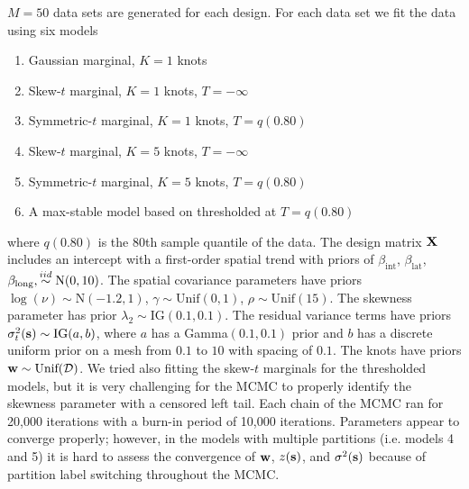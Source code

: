 \documentclass[11pt]{article}
\begin{document}


$M = 50$ data sets are generated for each design.
For each data set we fit the data using six models
\begin{enumerate} \setlength{\itemsep}{-0.5em}
  \item Gaussian marginal, $K=1$ knots
  \item Skew-$t$ marginal, $K=1$ knots, $T=-\infty$
  \item Symmetric-$t$ marginal, $K=1$ knots, $T=q(0.80)$
  \item Skew-$t$ marginal, $K=5$ knots, $T=-\infty$
  \item Symmetric-$t$ marginal, $K=5$ knots, $T=q(0.80)$
  \item A max-stable model based on \citet{Reich2012} thresholded at $T = q(0.80)$
\end{enumerate}
where $q(0.80)$ is the 80th sample quantile of the data.
The design matrix $\mbox{\bf X}$ includes an intercept with a first-order spatial trend with priors of $\beta_\text{int}$, $\beta_\text{lat}$, $\beta_\text{long},  \stackrel{iid}{\sim} \text{N}(0, 10)$.
The spatial covariance parameters have priors $\log(\nu) \sim \text{N}(-1.2, 1)$, $\gamma \sim \text{Unif}(0, 1)$, $\rho \sim \text{Unif}(15)$.
The skewness parameter has prior $\lambda_2 \sim \text{IG}(0.1, 0.1)$.
The residual variance terms have priors $\sigma^2_t(\mbox{\bf s}) \sim \text{IG}(a, b)$, where $a$ has a Gamma$(0.1, 0.1)$ prior and $b$ has a discrete uniform prior on a mesh from $0.1$ to $10$ with spacing of $0.1$.
The knots have priors $\mbox{\bf w} \sim \text{Unif}({\cal D})$.
We tried also fitting the skew-$t$ marginals for the thresholded models, but it is very challenging for the MCMC to properly identify the skewness parameter with a censored left tail.
Each chain of the MCMC ran for 20,000 iterations with a burn-in period of 10,000 iterations.
Parameters appear to converge properly; however, in the models with multiple partitions (i.e. models 4 and 5) it is hard to assess the convergence of $\mbox{\bf w}$, $z(\mbox{\bf s})$, and $\sigma^2(\mbox{\bf s})$ because of partition label switching throughout the MCMC.
\end{document}
